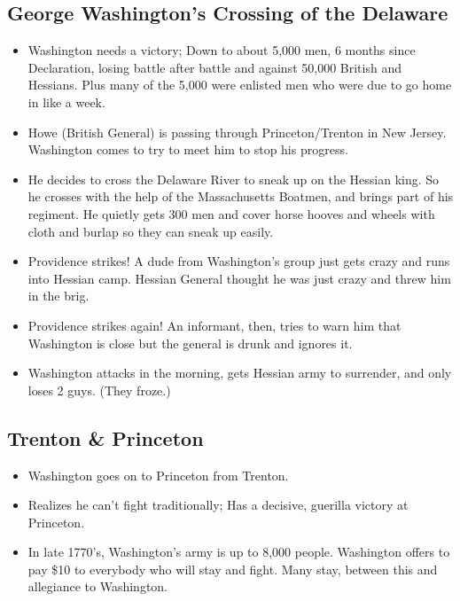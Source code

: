 \documentclass{article}
\begin{document}
    \subsection{George Washington's Crossing of the Delaware}
      \begin{itemize}
        \item Washington needs a victory; Down to about 5,000 men, 6 months since Declaration, losing battle after battle and against 50,000 British and Hessians. Plus many of the 5,000 were enlisted men who were due to go home in like a week.
        \item Howe (British General) is passing through Princeton/Trenton in New Jersey. Washington comes to try to meet him to stop his progress.
        \item He decides to cross the Delaware River to sneak up on the Hessian king. So he crosses with the help of the Massachusetts Boatmen, and brings part of his regiment. He quietly gets 300 men and cover horse hooves and wheels with cloth and burlap so they can sneak up easily.
        \item Providence strikes! A dude from Washington's group just gets crazy and runs into Hessian camp. Hessian General thought he was just crazy and threw him in the brig.
        \item Providence strikes again! An informant, then, tries to warn him that Washington is close but the general is drunk and ignores it.
        \item Washington attacks in the morning, gets Hessian army to surrender, and only loses 2 guys. (They froze.)
      \end{itemize}

    \subsection{Trenton \& Princeton}
      \begin{itemize}
        \item Washington goes on to Princeton from Trenton.
        \item Realizes he can't fight traditionally; Has a decisive, guerilla victory at Princeton.
        \item In late 1770's, Washington's army is up to 8,000 people. Washington offers to pay \$10 to everybody who will stay and fight. Many stay, between this and allegiance to Washington.
      \end{itemize}
\end{document}
